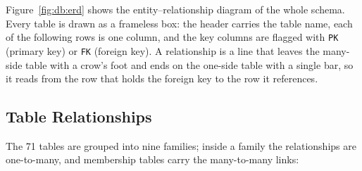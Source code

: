 Figure~\ref{fig:db:erd} shows the entity--relationship diagram of the whole schema.
Every table is drawn as a frameless box: the header carries the table name, each of the
following rows is one column, and the key columns are flagged with \texttt{PK} (primary
key) or \texttt{FK} (foreign key). A relationship is a line that leaves the many-side
table with a crow's foot and ends on the one-side table with a single bar, so it reads
from the row that holds the foreign key to the row it references.


\subsection{Table Relationships}

The 71 tables are grouped into nine families; inside a family the relationships are
one-to-many, and membership tables carry the many-to-many links:

